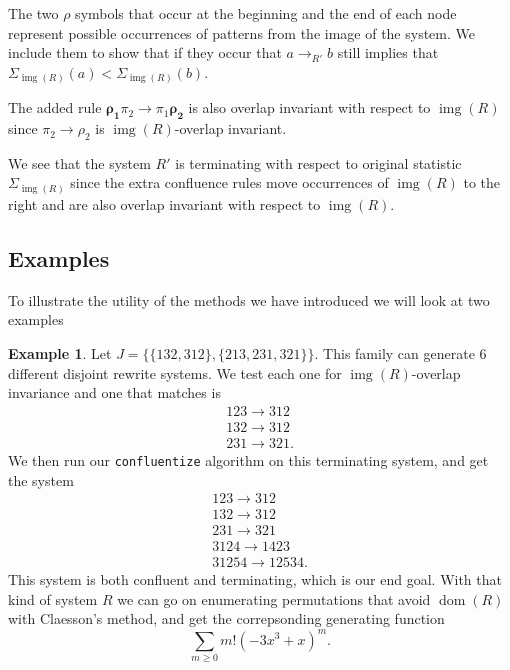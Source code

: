 \documentclass[a4paper, 11pt, english]{article}
\newcommand{\patternrule}{ \to \!}
\theoremstyle{definition}
\newtheorem{example}[theorem]{Example}
\DeclareMathOperator{\dom}{dom}
\DeclareMathOperator{\img}{img}
\begin{document}
The two $\rho$ symbols that occur at the beginning and the end of each node represent possible
occurrences of patterns from the image of the system. We include them to show that if they occur
that $a \to_{R'} b$ still implies that $\Sigma_{\img(R)}(a) < \Sigma_{\img(R)}(b)$.

The added rule $\bm{\rho_1} \pi_2 \patternrule \pi_1 \bm{\rho_2}$ is also
overlap invariant with respect to $\img(R)$ since $\pi_2 \patternrule \rho_2$ is $\img(R)$-overlap invariant.

We see that the system $R'$ is terminating with respect to original statistic $\Sigma_{\img(R)}$
since the extra confluence rules move occurrences of $\img(R)$ to the right and are also overlap
invariant with respect to $\img(R)$.

\subsection{Examples}
To illustrate the utility of the methods we have introduced we will look at two
examples

\begin{example}
Let $J=\{\{ 132, 312 \}, \{ 213, 231, 321 \}\}$. This family can generate 6
different disjoint rewrite systems. We test each one for $\img(R)$-overlap invariance 
and one that matches is 
\[
    \begin{matrix}
        123 \patternrule 312 \\
        132 \patternrule 312 \\
        231 \patternrule 321.
    \end{matrix}
\]
We then run our \verb|confluentize| algorithm on this terminating system, and get the system
\[
    \begin{matrix}
        123 \patternrule 312 \\
        132 \patternrule 312 \\
        231 \patternrule 321 \\
        3124 \patternrule 1423 \\
        31254 \patternrule 12534.
    \end{matrix}
\]
This system is both confluent and terminating, which is our end goal.
With that kind of system $R$ we can go on enumerating
permutations that avoid $\dom(R)$ with Claesson's method, and get the correpsonding generating
function 
\[
  \sum_{m \geq 0} m! (-3x^3 + x)^m.
\]
 
\end{example}
\end{document}
